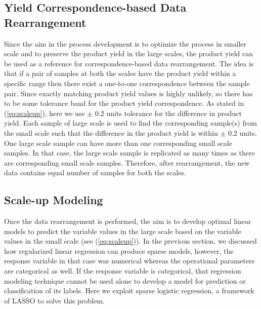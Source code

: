 \documentclass{article}
\begin{document}
\subsection{Yield Correspondence-based Data Rearrangement}
\label{ssec:datarearragement}

Since the aim in the process development is to optimize the process in smaller scale and to preserve the product yield in the large scales, the product yield can be used as a reference for correspondence-based data rearrangement. The idea is that if a pair of samples at both the scales have the product yield within a specific range then there exist a one-to-one correspondence between the sample pair. Since exactly matching product yield values is highly unlikely, so there has to be some tolerance band for the product yield correspondence. As stated in (\ref{eq:scaleup}), here we use $\pm$ 0.2 units tolerance for the difference in product yield. Each sample of large scale is used to find the corresponding sample(s) from the small scale such that the difference in the product yield is within $\pm$ 0.2 units. One large scale sample can have more than one corresponding small scale samples. In that case, the large scale sample is replicated as many times as there are corresponding small scale samples. Therefore, after %
rearrangement, the new data contains equal number of samples for both the scales. 

\subsection{Scale-up Modeling}
\label{ssec:scaleupmodeling}

Once the data rearrangement is performed, the aim is to develop optimal linear models  to predict the variable values in the large scale based on the variable values in the small scale (see (\ref{eq:scaleup})). 
In the previous section, we discussed how regularized linear regression can produce sparse models, however, the response variable in that case was numerical whereas the operational parameters are categorical as well. If the response variable is categorical, that regression modeling technique cannot be used alone to develop a model for prediction or classification of its labels. %
Here we exploit sparse logistic regression, a framework of LASSO \cite{ScaleUp_MLSP:friedman10, ScaleUp_MLSP:huttunen11} to solve this problem.
\end{document}

